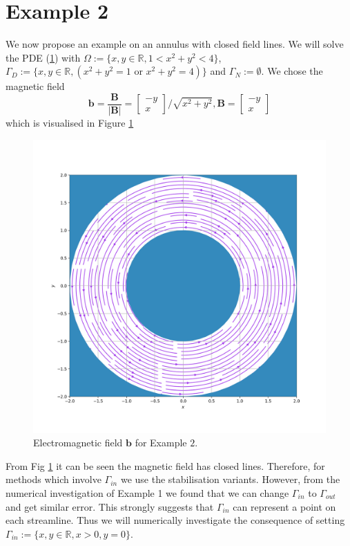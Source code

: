 \documentclass[12pt,a4paper]{article}
\begin{document}
\section{Example 2}
We now propose an example on an annulus with closed field lines.
We will solve the PDE (\ref{}) with $\Omega := \{x,y \in \mathbb{R}, 1<x^2+y^2<4\}$, $\Gamma_D := \{x,y \in \mathbb{R}, (x^2+y^2=1 \text{ or } x^2+y^2=4)\}$ and $\Gamma_N := \emptyset$. We chose the magnetic field 
\begin{equation}
\mathbf{b} = \frac{\mathbf{B}}{|\mathbf{B}|} = 
\left[ \begin{matrix}
-y\\
 x
\end{matrix} \right]/\sqrt{x^2+y^2}, 
\mathbf{B} = \left[ \begin{matrix}
-y\\
 x
\end{matrix} \right]
\end{equation}
which is visualised in Figure \ref{E2_VF}
\begin{figure}[H]
 \includegraphics[width=\textwidth]{Pics/VectorField/E2b.png}
  \caption{Electromagnetic field $\mathbf{b}$ for Example $2$.}
 \label{E2_VF}
\end{figure}

From Fig \ref{E2_VF} it can be seen the magnetic field has closed lines. Therefore, for methods which involve $\Gamma_{in}$ we use the stabilisation variants. However, from the numerical investigation of Example 1 we found that we can change $\Gamma_{in}$ to $\Gamma_{out}$ and get similar error. This strongly suggests that $\Gamma_{in}$ can represent a point on each streamline. Thus we will numerically investigate the consequence of setting $\Gamma_{in}:=\{x,y \in \mathbb{R}, x>0, y=0\}$.
\end{document}
